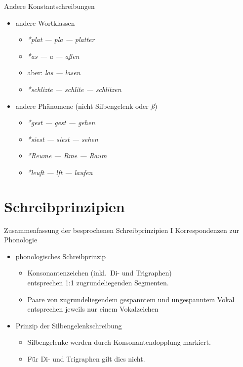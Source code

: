 \begin{frame}
  {Andere Konstantschreibungen}
  \pause
  \begin{itemize}[<+->]
    \item andere Wortklassen
      \begin{itemize}[<+->]
        \item \textit{*plat --- pla --- pla\alert{tt}er}
        \item \textit{*as --- a --- a\alert{ß}en}
        \item aber: \textit{las --- lasen}
        \item \textit{*schlizte --- schlite --- schli\alert{tz}en}
      \end{itemize}
      \Halbzeile
    \item andere Phänomene (nicht Silbengelenk oder \textit{ß})
      \begin{itemize}[<+->]
        \item \textit{*gest --- gest --- ge\alert{h}en}
        \item \textit{*siest --- siest --- se\alert{h}en}
        \item \textit{*Reume --- Rme --- R\alert{au}m}
        \item \textit{*leuft --- lft --- l\alert{au}fen}
      \end{itemize}
  \end{itemize}
\end{frame}

\section[Prinzipien]{Schreibprinzipien}

\begin{frame}
  {Zusammenfassung der besprochenen Schreibprinzipien I}
  \pause
  Korrespondenzen zur Phonologie\\
  \Zeile
  \pause
  \begin{itemize}[<+->]
    \item \alert{phonologisches Schreibprinzip}
      \begin{itemize}[<+->]
        \item Konsonantenzeichen (inkl.\ Di- und Trigraphen)\\
          entsprechen 1:1 zugrundeliegenden Segmenten.
        \item Paare von zugrundeliegendem gespanntem und ungespanntem Vokal\\
          entsprechen jeweils nur einem Vokalzeichen 
      \end{itemize}
     \Zeile 
    \item \alert{Prinzip der Silbengelenkschreibung}
      \begin{itemize}[<+->]
        \item Silbengelenke werden durch Konsonantendopplung markiert.
        \item Für Di- und Trigraphen gilt dies nicht.
      \end{itemize}
  \end{itemize}
\end{frame}

